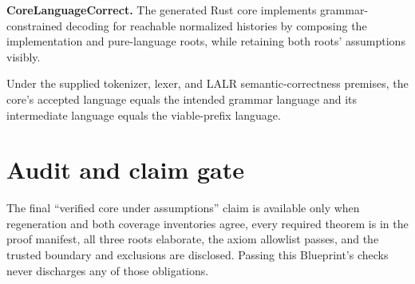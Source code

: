\begin{theorem}
  \label{thm:core-language-correct}
  \notready
  \textbf{CoreLanguageCorrect.}
  The generated Rust core implements grammar-constrained decoding for reachable
  normalized histories by composing the implementation and pure-language
  roots, while retaining both roots' assumptions visibly.
\end{theorem}

\begin{theorem}
  \label{thm:intended-grammar-corollary}
  \notready
  Under the supplied tokenizer, lexer, and LALR semantic-correctness premises,
  the core's accepted language equals the intended grammar language and its
  intermediate language equals the viable-prefix language.
\end{theorem}

\section{Audit and claim gate}

\begin{proposition}
  \label{prop:verification-claim-gate}
  \notready
  The final ``verified core under assumptions'' claim is available only when
  regeneration and both coverage inventories agree, every required theorem is
  in the proof manifest, all three roots elaborate, the axiom allowlist passes,
  and the trusted boundary and exclusions are disclosed.  Passing this
  Blueprint's checks never discharges any of those obligations.
\end{proposition}

